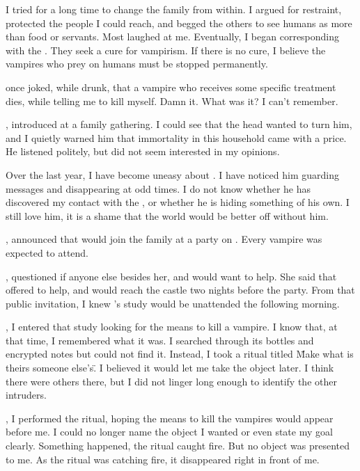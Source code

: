 {I tried for a long time to change the family from within. I argued for restraint, protected the people I could reach, and begged the others to see humans as more than food or servants. Most laughed at me. Eventually, I began corresponding with the . They seek a cure for vampirism. If there is no cure, I believe the vampires who prey on humans must be stopped permanently.

 once joked, while drunk, that a vampire who receives some specific treatment dies, while telling me to kill myself. Damn it. What was it? I can't remember.

,  introduced  at a family gathering. I could see that the head wanted to turn him, and I quietly warned him that immortality in this household came with a price. He listened politely, but did not seem interested in my opinions.

Over the last year, I have become uneasy about . I have noticed him guarding messages and disappearing at odd times. I do not know whether he has discovered my contact with the , or whether he is hiding something of his own. I still love him, it is a shame that the world would be better off without him.

,  announced that  would join the family at a party on . Every vampire was expected to attend.

,  questioned if anyone else besides her,  and  would want to help. She said that  offered to help, and would reach the castle two nights before the party. From that public invitation, I knew 's study would be unattended the following morning.

, I entered that study looking for the means to kill a vampire. I know that, at that time, I remembered what it was. I searched through its bottles and encrypted notes but could not find it. Instead, I took a ritual titled \"Make what is theirs someone else's\". I believed it would let me take the object later. I think there were others there, but I did not linger long enough to identify the other intruders.

, I performed the ritual, hoping the means to kill the vampires would appear before me. I could no longer name the object I wanted or even state my goal clearly. Something happened, the ritual caught fire. But no object was presented to me. As the ritual was catching fire, it disappeared right in front of me. 

}
